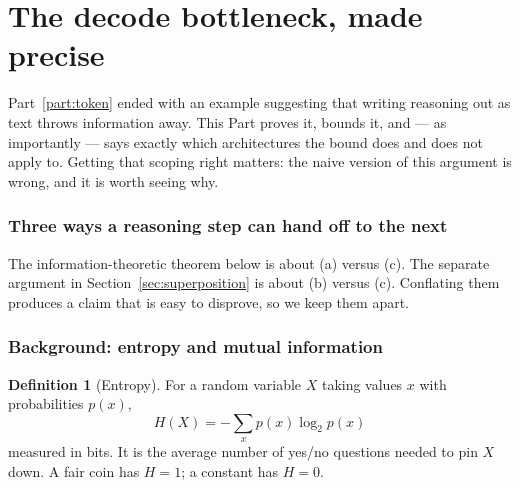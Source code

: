 \documentclass[11pt]{article}
\theoremstyle{definition}
\newtheorem{definition}[theorem]{Definition}
\begin{document}
\newpage
\part{The decode bottleneck, made precise}
\label{part:bottleneck}

Part~\ref{part:token} ended with an example suggesting that writing reasoning out as text throws information away. This Part proves it, bounds it, and --- as importantly --- says exactly which architectures the bound does and does not apply to. Getting that scoping right matters: the naive version of this argument is wrong, and it is worth seeing why.

\section{Three ways a reasoning step can hand off to the next}

\begin{center}
\end{center}

The information-theoretic theorem below is about (a) versus (c). The separate argument in Section~\ref{sec:superposition} is about (b) versus (c). Conflating them produces a claim that is easy to disprove, so we keep them apart.

\section{Background: entropy and mutual information}

\begin{definition}[Entropy]
For a random variable $X$ taking values $x$ with probabilities $p(x)$,
\[
H(X) = -\sum_x p(x)\log_2 p(x)
\]
measured in bits. It is the average number of yes/no questions needed to pin $X$ down. A fair coin has $H=1$; a constant has $H=0$.
\end{definition}
\end{document}
